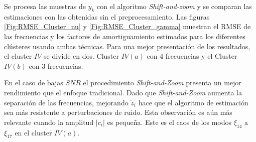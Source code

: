 			
			Se procesa las muestras de $y_k$ con el algoritmo \emph{Shift-and-zoom} y se comparan las estimaciones con las obtenidas sin el preprocesamiento. Las figuras \ref{Fig:RMSE_Cluster_nu} y \ref{Fig:RMSE_Cluster_gamma} muestran el RMSE de las frecuencias y los factores de amortiguamiento estimados para los diferentes clústeres usando ambas técnicas. Para una mejor presentación de los resultados, el cluster $IV$ se divide en dos. Cluster $IV(a)$ con 4 frecuencias y el Cluster $IV(b)$ con 3 frecuencias.
			
			En el caso de bajas $SNR$ el procedimiento \emph{Shift-and-Zoom} presenta un mejor rendimiento que el enfoque tradicional. Dado que \emph{Shift-and-Zoom} aumenta la separación de las frecuencias, mejorando $\dot{z}_i$ hace que el algoritmo de estimación sea más resistente a perturbaciones de ruido. Esta observación es aún más relevante cuando la amplitud $|c_i|$ es pequeña. Este es el caos de los modos $\xi_{14}$ a $\xi_{17}$ en el cluster $IV(a)$. 
			
